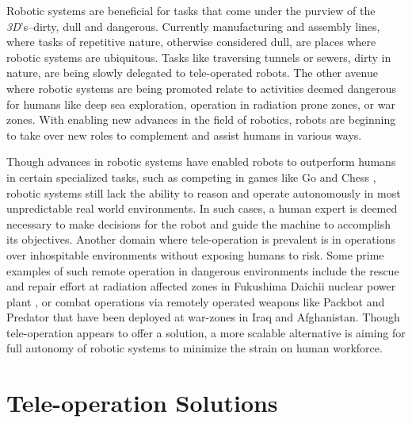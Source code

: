 \documentclass {udthesis}
\begin{document}
Robotic systems are beneficial for tasks that come under the purview of the \emph{3D}'s--dirty, dull and dangerous. 
Currently manufacturing and assembly lines, where tasks of repetitive nature, otherwise considered dull, are places where robotic systems are ubiquitous. Tasks like traversing tunnels or sewers, dirty in nature, are being slowly delegated to tele-operated robots. 
The other avenue where robotic systems are being promoted relate to activities deemed dangerous for humans like deep sea exploration, operation in radiation prone zones, 
or war zones. With enabling new advances in the field of robotics, robots are beginning to take over new roles to complement and assist humans in various ways.

Though advances in robotic systems have enabled robots to outperform humans in certain specialized tasks, such as competing in games like Go \cite{deepmind} and Chess \cite{deepblue}, 
robotic systems still lack the ability to reason and operate
autonomously in most unpredictable real world environments. 
In such cases, a human expert is deemed necessary to make decisions for the robot and guide the machine
to accomplish its objectives. Another domain where tele-operation is prevalent is in operations over inhospitable environments without exposing humans to risk. Some prime examples of such remote operation in
dangerous environments include the rescue and repair effort at radiation affected zones in Fukushima Daichii nuclear power plant \cite{fukushima}, or combat operations via remotely operated weapons like Packbot \cite{packbot} and Predator \cite{predator} that have been deployed
at war-zones in Iraq and Afghanistan. Though tele-operation appears to offer a solution, a more scalable alternative
is aiming for full autonomy of robotic systems to minimize the strain on human workforce.

\section{Tele-operation Solutions}
\end{document}
